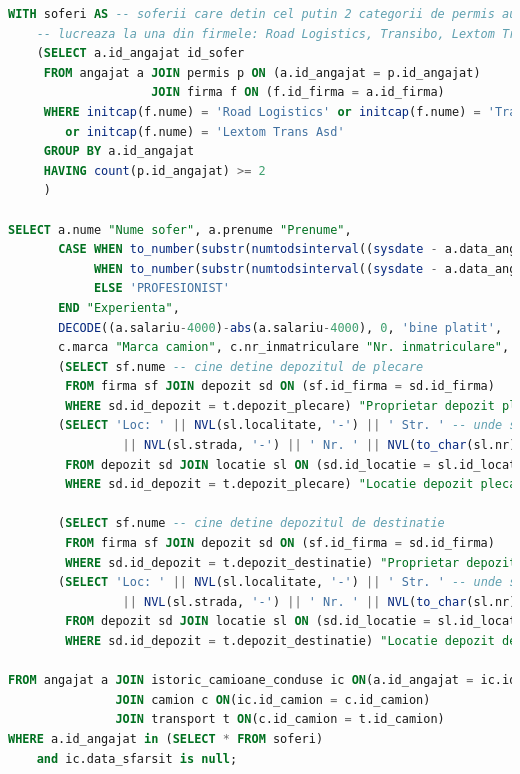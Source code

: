 \documentclass[12pt, a4paper]{article}
\begin{document}
\begin{lstlisting}[language=SQL]
WITH soferi AS -- soferii care detin cel putin 2 categorii de permis auto si care
    -- lucreaza la una din firmele: Road Logistics, Transibo, Lextom Trans Asd
    (SELECT a.id_angajat id_sofer
     FROM angajat a JOIN permis p ON (a.id_angajat = p.id_angajat)
                    JOIN firma f ON (f.id_firma = a.id_firma)
     WHERE initcap(f.nume) = 'Road Logistics' or initcap(f.nume) = 'Transibo'
        or initcap(f.nume) = 'Lextom Trans Asd'
     GROUP BY a.id_angajat
     HAVING count(p.id_angajat) >= 2
     )

SELECT a.nume "Nume sofer", a.prenume "Prenume",
       CASE WHEN to_number(substr(numtodsinterval((sysdate - a.data_angajare), 'DAY'), 2, 9)) <= 356 THEN 'INCEPATOR'
            WHEN to_number(substr(numtodsinterval((sysdate - a.data_angajare), 'DAY'), 2, 9)) <= 700 THEN 'AVANSAT'
            ELSE 'PROFESIONIST'
       END "Experienta",
       DECODE((a.salariu-4000)-abs(a.salariu-4000), 0, 'bine platit', 'prost platit') "Cat de bine este platit",
       c.marca "Marca camion", c.nr_inmatriculare "Nr. inmatriculare",
       (SELECT sf.nume -- cine detine depozitul de plecare
        FROM firma sf JOIN depozit sd ON (sf.id_firma = sd.id_firma)
        WHERE sd.id_depozit = t.depozit_plecare) "Proprietar depozit plecare",
       (SELECT 'Loc: ' || NVL(sl.localitate, '-') || ' Str. ' -- unde se afla depozitul
                || NVL(sl.strada, '-') || ' Nr. ' || NVL(to_char(sl.nr), '-')
        FROM depozit sd JOIN locatie sl ON (sd.id_locatie = sl.id_locatie)
        WHERE sd.id_depozit = t.depozit_plecare) "Locatie depozit plecare",

       (SELECT sf.nume -- cine detine depozitul de destinatie
        FROM firma sf JOIN depozit sd ON (sf.id_firma = sd.id_firma)
        WHERE sd.id_depozit = t.depozit_destinatie) "Proprietar depozit destinatie",
       (SELECT 'Loc: ' || NVL(sl.localitate, '-') || ' Str. ' -- unde se afla depozitul
                || NVL(sl.strada, '-') || ' Nr. ' || NVL(to_char(sl.nr), '-')
        FROM depozit sd JOIN locatie sl ON (sd.id_locatie = sl.id_locatie)
        WHERE sd.id_depozit = t.depozit_destinatie) "Locatie depozit destinatie"

FROM angajat a JOIN istoric_camioane_conduse ic ON(a.id_angajat = ic.id_angajat)
               JOIN camion c ON(ic.id_camion = c.id_camion)
               JOIN transport t ON(c.id_camion = t.id_camion)
WHERE a.id_angajat in (SELECT * FROM soferi)
    and ic.data_sfarsit is null;
\end{lstlisting}
\end{document}
